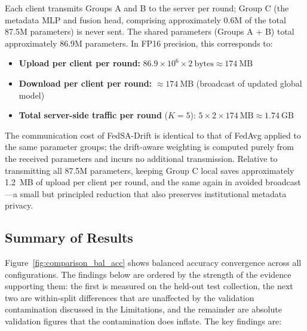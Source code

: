 \documentclass[utf8]{FrontiersinHarvard} %
\newcommand{\sadrift}{FedSA-Drift}
\begin{document}
Each client transmits Groups A and B to the server per round; Group C (the metadata MLP and fusion head, comprising approximately 0.6M of the total 87.5M parameters) is never sent. The shared parameters (Groups A + B) total approximately 86.9M parameters. In FP16 precision, this corresponds to:

\begin{itemize}
    \item \textbf{Upload per client per round:} $86.9 \times 10^6 \times 2~\text{bytes} \approx 174~\text{MB}$
    \item \textbf{Download per client per round:} $\approx 174~\text{MB}$ (broadcast of updated global model)
    \item \textbf{Total server-side traffic per round} ($K{=}5$): $5 \times 2 \times 174~\text{MB} \approx 1.74~\text{GB}$
\end{itemize}

The communication cost of \sadrift{} is identical to that of FedAvg applied to the same parameter groups; the drift-aware weighting is computed purely from the received parameters and incurs no additional transmission. Relative to transmitting all 87.5M parameters, keeping Group C local saves approximately 1.2~MB of upload per client per round, and the same again in avoided broadcast—a small but principled reduction that also preserves institutional metadata privacy.

\subsection{Summary of Results}

Figure~\ref{fig:comparison_bal_acc} shows balanced accuracy convergence across all configurations. The findings below are ordered by the strength of the evidence supporting them: the first is measured on the held-out test collection, the next two are within-split differences that are unaffected by the validation contamination discussed in the Limitations, and the remainder are absolute validation figures that the contamination does inflate. The key findings are:
\end{document}
